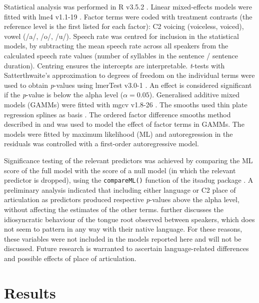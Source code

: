 \documentclass[preprint]{JASAnew}
\begin{document}
Statistical analysis was performed in R v3.5.2 \citep{r-core-team2018}.
Linear mixed-effects models were fitted with lme4 v1.1-19
\citep{bates2015}. Factor terms were coded with treatment contrasts (the
reference level is the first listed for each factor): C2 voicing
(voiceless, voiced), vowel (/a/, /o/, /u/). Speech rate was centred for
inclusion in the statistical models, by subtracting the mean speech rate
across all speakers from the calculated speech rate values (number of
syllables in the sentence / sentence duration). Centring ensures the
intercepts are interpretable. \emph{t}-tests with Satterthwaite's
approximation to degrees of freedom on the individual terms were used to
obtain \emph{p}-values using lmerTest v3.0-1
\citep{kuznetsova2017, luke2017}. An effect is considered significant if
the \emph{p}-value is below the alpha level (\(\alpha = 0.05\)).
Generalised additive mixed models (GAMMs) were fitted with mgcv v1.8-26
\citep{wood2011, wood2017}. The smooths used thin plate regression
splines as basis \citep{wood2003}. The ordered factor difference smooths
method described in \citet{soskuthy2017} and \citet{wieling2018} was
used to model the effect of factor terms in GAMMs. The models were
fitted by maximum likelihood (ML) and autoregression in the residuals
was controlled with a first-order autoregressive model.

Significance testing of the relevant predictors was achieved by
comparing the ML score of the full model with the score of a null model
(in which the relevant predictor is dropped), using the
\texttt{compareML()} function of the itsadug package
\citep{van-rij2017}. A preliminary analysis indicated that including
either language or C2 place of articulation as predictors produced
respective \emph{p}-values above the alpha level, without affecting the
estimates of the other terms.  further discusses the
idiosyncratic behaviour of the tongue root observed between speakers,
which does not seem to pattern in any way with their native language.
For these reasons, these variables were not included in the models
reported here and will not be discussed. Future research is warranted to
ascertain language-related differences and possible effects of place of
articulation.

\hypertarget{results}{%
\section{Results}\label{results}}

\label{s:results}
\end{document}
